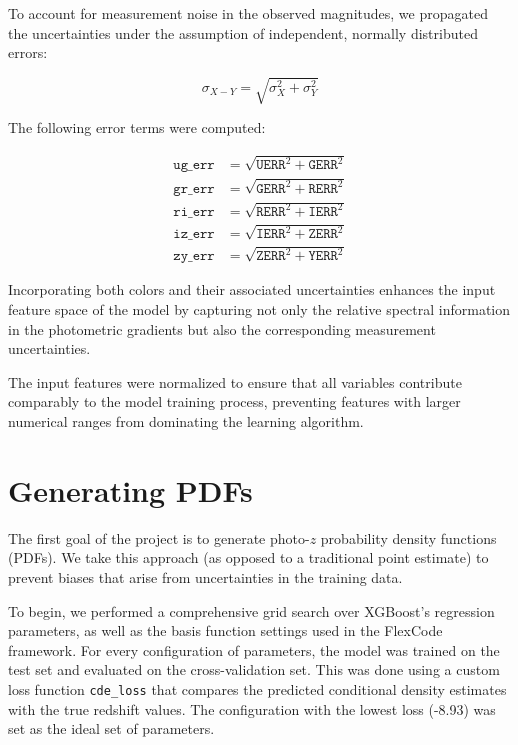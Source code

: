 \documentclass{article}
\begin{document}
To account for measurement noise in the observed magnitudes, we propagated the uncertainties under the assumption of independent, normally distributed errors:

\begin{equation}
\sigma_{X-Y} = \sqrt{\sigma_X^2 + \sigma_Y^2}
\end{equation}

The following error terms were computed:

\begin{align*}
\texttt{ug\_err} &= \sqrt{\texttt{UERR}^2 + \texttt{GERR}^2} \\
\texttt{gr\_err} &= \sqrt{\texttt{GERR}^2 + \texttt{RERR}^2} \\
\texttt{ri\_err} &= \sqrt{\texttt{RERR}^2 + \texttt{IERR}^2} \\
\texttt{iz\_err} &= \sqrt{\texttt{IERR}^2 + \texttt{ZERR}^2} \\
\texttt{zy\_err} &= \sqrt{\texttt{ZERR}^2 + \texttt{YERR}^2}
\end{align*}

Incorporating both colors and their associated uncertainties enhances the input feature space of the model by capturing not only the relative spectral information in the photometric gradients but also the corresponding measurement uncertainties.

The input features were normalized to ensure that all variables contribute comparably to the model training process, preventing features with larger numerical ranges from dominating the learning algorithm.

\section*{Generating PDFs}

The first goal of the project is to generate photo-$z$ probability density functions (PDFs). We take this approach (as opposed to a traditional point estimate) to prevent biases that arise from  uncertainties in the training data.

To begin, we performed a comprehensive grid search over XGBoost's regression parameters, as well as the basis function settings used in the FlexCode framework. For every configuration of parameters, the model was trained on the test set and evaluated on the cross-validation set. This was done using a custom loss function \texttt{cde\_loss} that compares the predicted conditional density estimates with the true redshift values. The configuration with the lowest loss (-8.93) was set as the ideal set of parameters.
\end{document}
